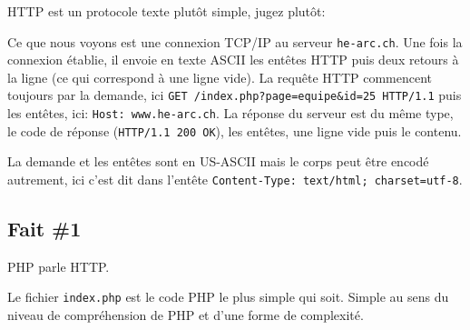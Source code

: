 HTTP est un protocole texte plutôt simple, jugez plutôt:

Ce que nous voyons est une connexion TCP/IP au serveur
\textenglish{\texttt{he-arc.ch}}. Une fois la connexion établie, il
envoie en texte ASCII les entêtes HTTP puis deux retours à la ligne (ce
qui correspond à une ligne vide). La requête HTTP commencent toujours
par la demande, ici
\textenglish{\texttt{GET\ /index.php?page=equipe\&id=25\ HTTP/1.1}} puis
les entêtes, ici: \textenglish{\texttt{Host:\ www.he-arc.ch}}. La
réponse du serveur est du même type, le code de réponse
(\textenglish{\texttt{HTTP/1.1\ 200\ OK}}), les entêtes, une ligne vide
puis le contenu.

La demande et les entêtes sont en US-ASCII mais le corps peut être
encodé autrement, ici c'est dit dans l'entête
\textenglish{\texttt{Content-Type:\ text/html;\ charset=utf-8}}.

\hypertarget{fait-1}{%
\subsection{Fait \#1}\label{fait-1}}

PHP parle HTTP.

Le fichier \textenglish{\texttt{index.php}} est le code PHP le plus
simple qui soit. Simple au sens du niveau de compréhension de PHP et
d'une forme de complexité.

